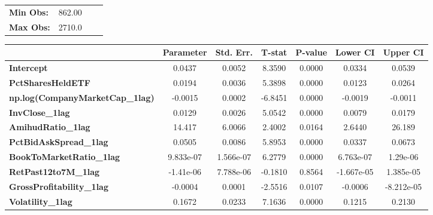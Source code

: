 {\begin{table}[htbp]
\begin{center}
\begin{tabular}{lclc}
      \textbf{Min Obs:}                       &       862.00       & \textbf{                     }   &                  \\
      \textbf{Max Obs:}                       &       2710.0       & \textbf{                     }   &                  \\
      \bottomrule
    \end{tabular}
    \begin{tabular}{lcccccc}
      & \textbf{Parameter} & \textbf{Std. Err.} & \textbf{T-stat} & \textbf{P-value} & \textbf{Lower CI} & \textbf{Upper CI}  \\
      \midrule
      \textbf{Intercept}                      &       0.0437       &       0.0052       &      8.3590     &      0.0000      &       0.0334      &       0.0539       \\
      \textbf{PctSharesHeldETF}               &       0.0194       &       0.0036       &      5.3898     &      0.0000      &       0.0123      &       0.0264       \\
      \textbf{np.log(CompanyMarketCap\_1lag)} &      -0.0015       &       0.0002       &     -6.8451     &      0.0000      &      -0.0019      &      -0.0011       \\
      \textbf{InvClose\_1lag}                 &       0.0129       &       0.0026       &      5.0542     &      0.0000      &       0.0079      &       0.0179       \\
      \textbf{AmihudRatio\_1lag}              &       14.417       &       6.0066       &      2.4002     &      0.0164      &       2.6440      &       26.189       \\
      \textbf{PctBidAskSpread\_1lag}          &       0.0505       &       0.0086       &      5.8953     &      0.0000      &       0.0337      &       0.0673       \\
      \textbf{BookToMarketRatio\_1lag}        &     9.833e-07      &     1.566e-07      &      6.2779     &      0.0000      &     6.763e-07     &      1.29e-06      \\
      \textbf{RetPast12to7M\_1lag}            &     -1.41e-06      &     7.788e-06      &     -0.1810     &      0.8564      &     -1.667e-05    &     1.385e-05      \\
      \textbf{GrossProfitability\_1lag}       &      -0.0004       &       0.0001       &     -2.5516     &      0.0107      &      -0.0006      &     -8.212e-05     \\
      \textbf{Volatility\_1lag}               &       0.1672       &       0.0233       &      7.1636     &      0.0000      &       0.1215      &       0.2130       \\

\end{tabular}
\end{center}
\end{table}}
